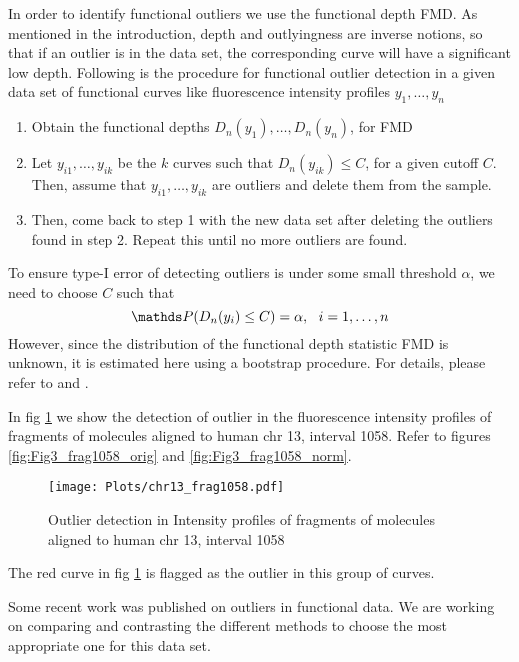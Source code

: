 In order to identify functional outliers we use the functional depth FMD. As mentioned in the introduction, depth and outlyingness are inverse notions, so that if an outlier is in the data set, 
the corresponding curve will have a significant low depth. Following is the procedure for functional outlier detection in a given data set of functional curves like fluorescence intensity profiles
$y_1, \dots, y_n$
\begin{enumerate}
\item Obtain the functional depths $D_n(y_1), \dots, D_n(y_n)$, for FMD
\item Let $y_{i1}, \dots, y_{ik}$ be the $k$ curves such that $D_n(y_{ik}) \leq C$, for a given cutoff $C$. Then, assume that $y_{i1}, \dots, y_{ik}$ are outliers and delete them from the sample.
\item Then, come back to step 1 with the new data set after deleting the outliers found in step 2. Repeat this until no more outliers are found.
\end{enumerate}
To ensure type-I error of detecting outliers is under some small threshold $\alpha$, we need to choose $C$ such that
\[ \Prob(D_n(y_i) \leq C) = \alpha,\ \ i = 1, \dots, n\]
However, since the distribution of the functional depth statistic FMD is unknown, it is estimated here using a bootstrap procedure. For details, please refer to \cite{Febrero-Bande_etal_2007_Environmetrics} and \cite{Febrero-Bande_delaFuente_2012_JSS}. 

In fig \ref{fig:Fig3_frag1058_outlier} we show the detection of outlier in the fluorescence intensity profiles of fragments of molecules aligned to human chr 13, interval 1058. Refer to figures \ref{fig:Fig3_frag1058_orig} and \ref{fig:Fig3_frag1058_norm}. 
\begin{figure}[H]
\begin{center}
\texttt{[image: Plots/chr13\_frag1058.pdf]}
\end{center}
\caption{Outlier detection in Intensity profiles of fragments of molecules aligned to human chr 13, interval 1058}
\label{fig:Fig3_frag1058_outlier}
\end{figure}
The red curve in fig \ref{fig:Fig3_frag1058_outlier} is flagged as the outlier in this group of curves.
\begin{tcolorbox}[colback=green!5,colframe=green!40!black,title=Work in progress] %
Some recent work was published on outliers in functional data. We are working on comparing and contrasting the different methods to choose the most appropriate one for this data set.
\end{tcolorbox}

